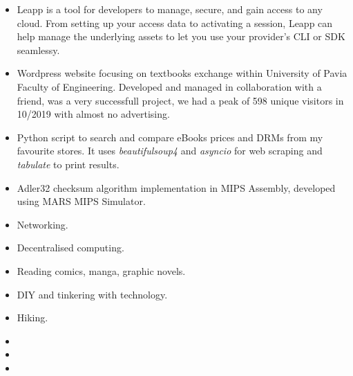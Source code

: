 \begin{itemize}
\item Leapp is a tool for developers to manage, secure, and gain access to any cloud. From setting up your access data to activating a session, Leapp can help manage the underlying assets to let you use your provider's CLI or SDK seamlessy.
\end{itemize}
\smallskip
\smallskip
{}
\begin{itemize}
\item Wordpress website focusing on textbooks exchange within University of Pavia Faculty of Engineering. Developed and managed in collaboration with a friend, was a very successfull project, we had a peak of 598 unique visitors in 10/2019 with almost no advertising.
\end{itemize}
\begin{itemize}
\item Python script to search and compare eBooks prices and DRMs from my favourite stores. It uses \textit{beautifulsoup4} and \textit{asyncio} for web scraping and \textit{tabulate} to print results.
\end{itemize}
\smallskip
\smallskip
{}
\begin{itemize}
\item Adler32 checksum algorithm implementation in MIPS Assembly, developed using MARS MIPS Simulator.
\end{itemize}
\smallskip
\smallskip


\begin{itemize}
\item Networking.
\item Decentralised computing.
\end{itemize}
\smallskip
{}
\begin{itemize}
\item Reading comics, manga, graphic novels.
\item DIY and tinkering with technology.
\item Hiking.
\end{itemize}


\begin{itemize}
 \item {}
 \item {}
 \item {}
\end{itemize}
